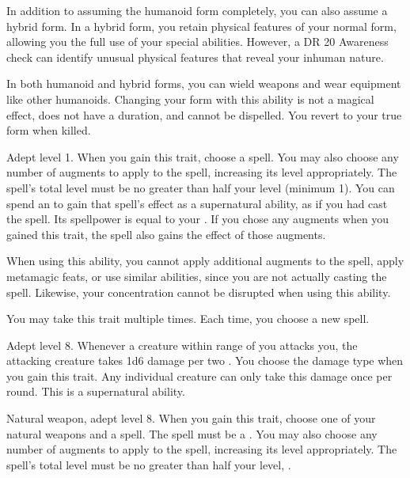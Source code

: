     In addition to assuming the humanoid form completely, you can also assume a hybrid form.
    In a hybrid form, you retain physical features of your normal form, allowing you the full use of your special abilities.
    However, a DR 20 Awareness check can identify unusual physical features that reveal your inhuman nature.

    In both humanoid and hybrid forms, you can wield weapons and wear equipment like other humanoids.
    Changing your form with this ability is not a magical effect, does not have a duration, and cannot be dispelled.
    You revert to your true form when killed.

    \featpre Adept level 1.
    \featben When you gain this trait, choose a spell.
    You may also choose any number of augments to apply to the spell, increasing its level appropriately.
    The spell's total level must be no greater than half your level (minimum 1).
    You can spend an  to gain that spell's effect as a supernatural ability, as if you had cast the spell.
    Its spellpower is equal to your .
    If you chose any augments when you gained this trait, the spell also gains the effect of those augments.

    When using this ability, you cannot apply additional augments to the spell, apply metamagic feats, or use similar abilities, since you are not actually casting the spell.
    Likewise, your concentration cannot be disrupted when using this ability.

     You may take this trait multiple times.
    Each time, you choose a new spell.

    \featpre Adept level 8.
    \featben Whenever a creature within \rngmed range of you attacks you, the attacking creature takes 1d6 damage per two .
    You choose the damage type when you gain this trait.
    Any individual creature can only take this damage once per round.
    This is a supernatural ability.

    \featpres Natural weapon, adept level 8.
    \featben When you gain this trait, choose one of your natural weapons and a spell.
    The spell must be a .
    You may also choose any number of augments to apply to the spell, increasing its level appropriately.
    The spell's total level must be no greater than half your level, .

